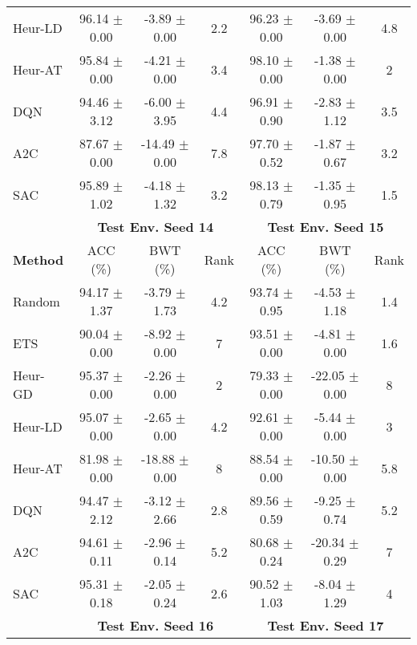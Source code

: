 \begin{tabular}{lcccccc}
	Heur-LD         & 96.14 $\pm$ 0.00    & -3.89 $\pm$ 0.00    & 2.2    & 96.23 $\pm$ 0.00    & -3.69 $\pm$ 0.00    & 4.8    \\
	Heur-AT         & 95.84 $\pm$ 0.00    & -4.21 $\pm$ 0.00    & 3.4    & 98.10 $\pm$ 0.00    & -1.38 $\pm$ 0.00    & 2      \\
	DQN             & 94.46 $\pm$ 3.12    & -6.00 $\pm$ 3.95    & 4.4    & 96.91 $\pm$ 0.90    & -2.83 $\pm$ 1.12    & 3.5    \\
	A2C             & 87.67 $\pm$ 0.00    & -14.49 $\pm$ 0.00   & 7.8    & 97.70 $\pm$ 0.52    & -1.87 $\pm$ 0.67    & 3.2    \\
	SAC             & 95.89 $\pm$ 1.02    & -4.18 $\pm$ 1.32    & 3.2    & 98.13 $\pm$ 0.79    & -1.35 $\pm$ 0.95    & 1.5    \\
	\midrule 
	& \multicolumn{3}{c}{\textbf{Test Env. Seed 14}} & \multicolumn{3}{c}{\textbf{Test Env. Seed 15}} \\
	\cmidrule(lr){2-4} \cmidrule(lr){5-7}
	\textbf{Method} & ACC (\%)          & BWT (\%)          & Rank   & ACC (\%)          & BWT (\%)          & Rank   \\
	\midrule 
	Random          & 94.17 $\pm$ 1.37    & -3.79 $\pm$ 1.73    & 4.2    & 93.74 $\pm$ 0.95    & -4.53 $\pm$ 1.18    & 1.4    \\
	ETS             & 90.04 $\pm$ 0.00    & -8.92 $\pm$ 0.00    & 7      & 93.51 $\pm$ 0.00    & -4.81 $\pm$ 0.00    & 1.6    \\
	Heur-GD         & 95.37 $\pm$ 0.00    & -2.26 $\pm$ 0.00    & 2      & 79.33 $\pm$ 0.00    & -22.05 $\pm$ 0.00   & 8      \\
	Heur-LD         & 95.07 $\pm$ 0.00    & -2.65 $\pm$ 0.00    & 4.2    & 92.61 $\pm$ 0.00    & -5.44 $\pm$ 0.00    & 3      \\
	Heur-AT         & 81.98 $\pm$ 0.00    & -18.88 $\pm$ 0.00   & 8      & 88.54 $\pm$ 0.00    & -10.50 $\pm$ 0.00   & 5.8    \\
	DQN             & 94.47 $\pm$ 2.12    & -3.12 $\pm$ 2.66    & 2.8    & 89.56 $\pm$ 0.59    & -9.25 $\pm$ 0.74    & 5.2    \\
	A2C             & 94.61 $\pm$ 0.11    & -2.96 $\pm$ 0.14    & 5.2    & 80.68 $\pm$ 0.24    & -20.34 $\pm$ 0.29   & 7      \\
	SAC             & 95.31 $\pm$ 0.18    & -2.05 $\pm$ 0.24    & 2.6    & 90.52 $\pm$ 1.03    & -8.04 $\pm$ 1.29    & 4      \\
	\midrule 
	& \multicolumn{3}{c}{\textbf{Test Env. Seed 16}} & \multicolumn{3}{c}{\textbf{Test Env. Seed 17}} \\

\end{tabular}

